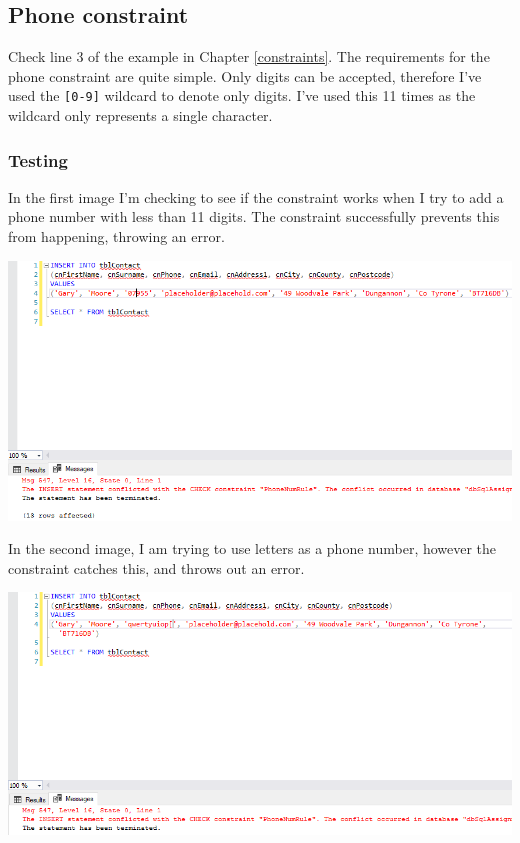 \documentclass[11pt,a4paper]{scrartcl}
\begin{document}
	\subsection{Phone constraint}\label{phoneconstraint}
	
	Check line 3 of the example in Chapter \ref{constraints}. The requirements for the phone constraint are quite simple. Only digits can be accepted, therefore I've used the \texttt{[0-9]} wildcard to denote only digits. I've used this 11 times as the wildcard only represents a single character.
	
	\subsubsection*{Testing}
	
	In the first image I'm checking to see if the constraint works when I try to add a phone number with less than 11 digits. The constraint successfully prevents this from happening, throwing an error.
	
	\begin{center}
		\includegraphics[width=0.9\linewidth]{images/PhoneConstraintTest1}
	\end{center}
	
	In the second image, I am trying to use letters as a phone number, however the constraint catches this, and throws out an error.
	
	\begin{center}
		\includegraphics[width=0.9\linewidth]{images/PhoneConstraintTest2}
	\end{center}
	
\end{document}
